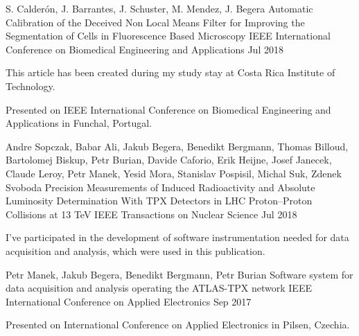 \begin{cventries}
    \cventry
      {S. Calderón, J. Barrantes, J. Schuster, M. Mendez, J. Begera}
      {Automatic Calibration of the Deceived Non Local Means Filter for Improving the Segmentation of Cells in Fluorescence Based Microscopy}
      {IEEE International Conference on Biomedical Engineering and Applications}
      {Jul 2018}
      {
        \begin{cvitems}
          \item {This article has been created during my study stay at Costa Rica Institute of Technology.}
          \item {Presented on IEEE International Conference on Biomedical Engineering and Applications in Funchal, Portugal.}
        \end{cvitems}
      }
    \cventry
      {Andre Sopczak, Babar Ali, Jakub Begera, Benedikt Bergmann, Thomas Billoud, Bartolomej Biskup, Petr Burian, Davide Caforio, Erik Heijne, Josef Janecek, Claude Leroy, Petr Manek, Yesid Mora, Stanislav Pospisil, Michal Suk, Zdenek Svoboda}
      {Precision Measurements of Induced Radioactivity and Absolute Luminosity Determination With TPX Detectors in LHC Proton--Proton Collisions at 13 TeV}
      {IEEE Transactions on Nuclear Science}
      {Jul 2018}
      {
        \begin{cvitems}
          \item {I've participated in the development of software instrumentation needed for data acquisition and analysis, which were used in this publication.}
        \end{cvitems}
      }
    \cventry
      {Petr Manek, Jakub Begera, Benedikt Bergmann, Petr Burian}
      {Software system for data acquisition and analysis operating the ATLAS-TPX network}
      {IEEE International Conference on Applied Electronics}
      {Sep 2017}
      {
        \begin{cvitems}
          \item {Presented on International Conference on Applied Electronics in Pilsen, Czechia.}
        \end{cvitems}
      }
\end{cventries}
